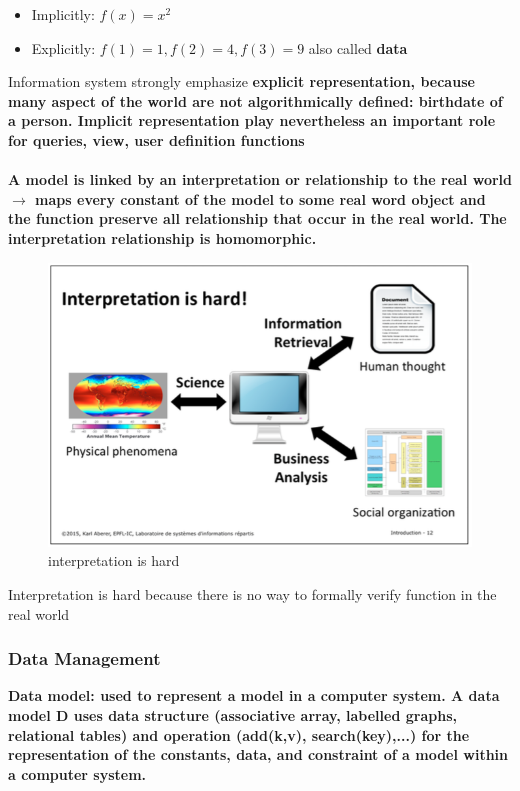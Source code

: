 \begin{itemize}
\item Implicitly: $f(x) = x^2$
\item Explicitly: $f(1) = 1, f(2) = 4, f(3) = 9$ also called \bf{data}
\end{itemize}
Information system strongly emphasize \bf{explicit} representation, because many aspect of the world are not algorithmically defined: birthdate of a person. \bf{Implicit} representation play nevertheless an important role for queries, view, user definition functions
\\
\\
A model is linked by an \bf{interpretation or relationship} to the real world $\rightarrow$ maps every constant of the model to some real word object and the function preserve all relationship that occur in the real world. The interpretation relationship is \bf{homomorphic}. 

\begin{figure}[!h]
\begin{center}
\includegraphics[width=1\linewidth]{figures/interpretation_hard.png}
\end{center}
\caption{interpretation is hard}
\end{figure}

Interpretation is hard because there is no way to formally verify function in the real world

\subsubsection{Data Management}
 \bf{Data model}: used to represent a model in a computer system. A data model D uses \bf{data structure} (associative array, labelled graphs, relational tables) and \bf{operation} (add(k,v), search(key),...) for the representation of the constants, data, and constraint of a model within a computer system.
 
